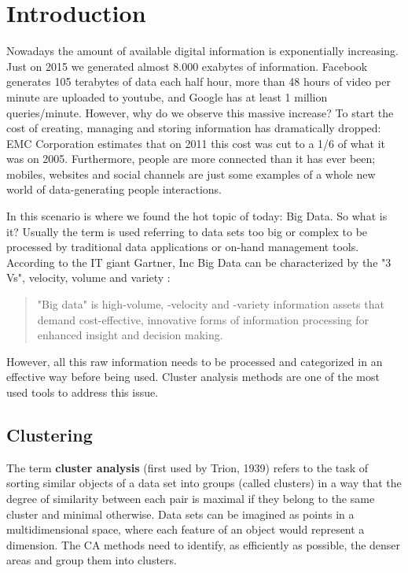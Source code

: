 \chapter{Introduction}

Nowadays the amount of available digital information is exponentially increasing. Just on 2015 we generated almost 8.000 exabytes of information. Facebook generates 105 terabytes of data each half hour, more than 48 hours of video per minute are uploaded to youtube, and Google has at least 1 million queries/minute. However, why do we observe this massive increase? To start the cost of creating, managing and storing information has dramatically dropped: EMC Corporation estimates that on 2011 this cost was cut to a 1/6 of what it was on 2005. Furthermore, people are more connected than it has ever been; mobiles, websites and social channels are just some examples of a whole new world of data-generating people interactions. 

In this scenario is where we found the hot topic of today: Big Data. So what is it? Usually the term is used referring to data sets too big or complex to be processed by traditional data applications or on-hand management tools. According to the IT giant Gartner, Inc Big Data can be characterized by the "3 Vs", velocity, volume and variety \cite{Laney}:

\begin{quotation}
"Big data" is high-volume, -velocity and -variety information assets that demand cost-effective, innovative forms of information processing for enhanced insight and decision making.
\end{quotation}


However, all this raw information needs to be processed and categorized in an effective way before being used. Cluster analysis methods are one of the most used tools to address this issue. 

\section{Clustering}

The term \textbf{cluster analysis} (first used by Trion, 1939) refers to the task of sorting similar objects of a data set into groups (called clusters) in a way that the degree of similarity between each pair is maximal if they belong to the same cluster and minimal otherwise. Data sets can be imagined as points in a multidimensional space, where each feature of an object would represent a dimension. The CA methods need to identify, as efficiently as possible, the denser areas and group them into clusters.

